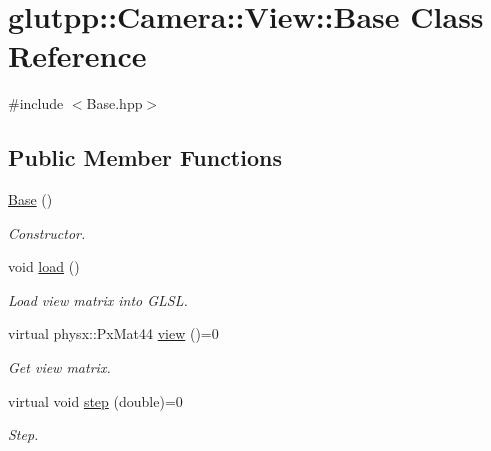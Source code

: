 \hypertarget{classglutpp_1_1Camera_1_1View_1_1Base}{\section{glutpp\-:\-:\-Camera\-:\-:\-View\-:\-:\-Base \-Class \-Reference}
\label{classglutpp_1_1Camera_1_1View_1_1Base}
}


 




{\ttfamily \#include $<$\-Base.\-hpp$>$}

\subsection*{\-Public \-Member \-Functions}
\begin{DoxyCompactItemize}
\item 
\hypertarget{classglutpp_1_1Camera_1_1View_1_1Base_a8626b57193663cc8b2c0810ce8d1e2b4}{\hyperlink{classglutpp_1_1Camera_1_1View_1_1Base_a8626b57193663cc8b2c0810ce8d1e2b4}{\-Base} ()}\label{classglutpp_1_1Camera_1_1View_1_1Base_a8626b57193663cc8b2c0810ce8d1e2b4}

\begin{DoxyCompactList}\small\item\em \-Constructor. \end{DoxyCompactList}\item 
\hypertarget{classglutpp_1_1Camera_1_1View_1_1Base_aa50111a2f1afe732fb01a073b35cc0c0}{void \hyperlink{classglutpp_1_1Camera_1_1View_1_1Base_aa50111a2f1afe732fb01a073b35cc0c0}{load} ()}\label{classglutpp_1_1Camera_1_1View_1_1Base_aa50111a2f1afe732fb01a073b35cc0c0}

\begin{DoxyCompactList}\small\item\em \-Load view matrix into \-G\-L\-S\-L. \end{DoxyCompactList}\item 
\hypertarget{classglutpp_1_1Camera_1_1View_1_1Base_aec6d02a770804a4a2b02d24c473275a4}{virtual physx\-::\-Px\-Mat44 \hyperlink{classglutpp_1_1Camera_1_1View_1_1Base_aec6d02a770804a4a2b02d24c473275a4}{view} ()=0}\label{classglutpp_1_1Camera_1_1View_1_1Base_aec6d02a770804a4a2b02d24c473275a4}

\begin{DoxyCompactList}\small\item\em \-Get view matrix. \end{DoxyCompactList}\item 
virtual void \hyperlink{classglutpp_1_1Camera_1_1View_1_1Base_abce83ff7d7f2b50811489ff85cd870c7}{step} (double)=0
\begin{DoxyCompactList}\small\item\em \-Step. \end{DoxyCompactList}\end{DoxyCompactItemize}
